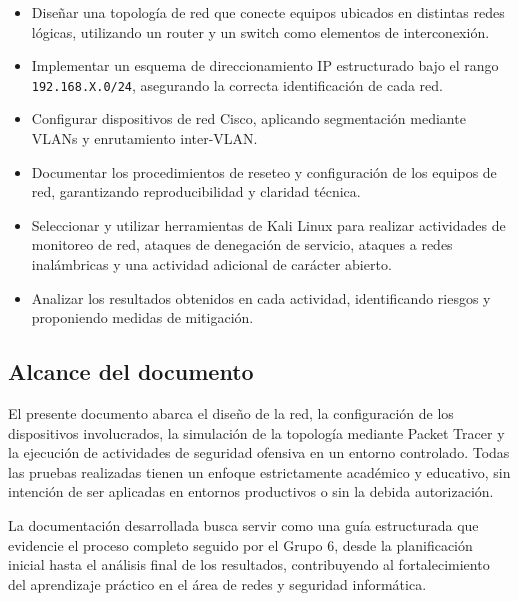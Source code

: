 \begin{itemize}
    \item Diseñar una topología de red que conecte equipos ubicados en distintas redes lógicas, utilizando un router y un switch como elementos de interconexión.
    \item Implementar un esquema de direccionamiento IP estructurado bajo el rango \texttt{192.168.X.0/24}, asegurando la correcta identificación de cada red.
    \item Configurar dispositivos de red Cisco, aplicando segmentación mediante VLANs y enrutamiento inter-VLAN.
    \item Documentar los procedimientos de reseteo y configuración de los equipos de red, garantizando reproducibilidad y claridad técnica.
    \item Seleccionar y utilizar herramientas de Kali Linux para realizar actividades de monitoreo de red, ataques de denegación de servicio, ataques a redes inalámbricas y una actividad adicional de carácter abierto.
    \item Analizar los resultados obtenidos en cada actividad, identificando riesgos y proponiendo medidas de mitigación.
\end{itemize}

\subsection{Alcance del documento}

El presente documento abarca el diseño de la red, la configuración de los dispositivos involucrados, la simulación de la topología mediante Packet Tracer y la ejecución de actividades de seguridad ofensiva en un entorno controlado. Todas las pruebas realizadas tienen un enfoque estrictamente académico y educativo, sin intención de ser aplicadas en entornos productivos o sin la debida autorización.

La documentación desarrollada busca servir como una guía estructurada que evidencie el proceso completo seguido por el Grupo 6, desde la planificación inicial hasta el análisis final de los resultados, contribuyendo al fortalecimiento del aprendizaje práctico en el área de redes y seguridad informática.
